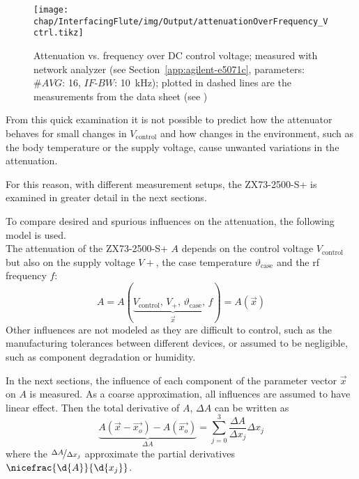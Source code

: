 \begin{figure}[tb]
	\centering
	\texttt{[image: chap/InterfacingFlute/img/Output/attenuationOverFrequency\_Vctrl.tikz]}
	\caption[Attenuation vs. frequency plot of the attenuator]{Attenuation vs. frequency over DC control voltage; measured with network analyzer (see Section~\ref{app:agilent-e5071c}, parameters: $\#AVG$: 16, $IF\text{-}BW$: \SI{10}{\kHz}); plotted in dashed lines are the measurements from the data sheet (see \cite[p.~2]{mini-circuitsZX732500VoltageVariable})}
	\label{fig:interfacingFlute_atteneval-overview-NA}
\end{figure}

From this quick examination it is not possible to predict how the attenuator behaves for small changes in $V_\text{control}$ and how changes in the environment, such as the body temperature or the supply voltage, cause unwanted variations in the attenuation. 

For this reason, with different measurement setups, the ZX73-2500-S+ is examined in greater detail in the next sections.

To compare desired and spurious influences on the attenuation, the following model is used.\\
The attenuation of the ZX73-2500-S+ $A$ depends on the control voltage $V_\text{control}$ but also on the supply voltage $V+$, the case temperature $\vartheta_\text{case}$ and the \gls{rf} frequency $f$:
\begin{equation}
A=A(\underbrace{V_\text{control},\,V_+,\,\vartheta_\text{case},\,f}_{\vec{x}}) = A\left(\vec{x}\right)
\end{equation}
Other influences are not modeled as they are difficult to control, such as the manufacturing tolerances between different devices, or assumed to be negligible, such as component degradation or humidity.

In the next sections, the influence of each component of the parameter vector $\vec{x}$ on $A$ is measured. As a coarse approximation, all influences are assumed to have linear effect. Then the total derivative of $A$, $\Delta A$ can be written as
\begin{equation}\label{eq:interfacingFlute_linearApprox}
\underbrace{A(\vec{x}-\vec{x_o})-A(\vec{x_o})}_{\Delta A} = \sum_{j=0}^{3} \frac{\Delta A}{\Delta x_j} \Delta x_j
\end{equation}
where the $\nicefrac{\Delta A}{\Delta x_j}$ approximate the partial derivatives $\nicefrac{\d{A}}{\d{x_j}}$.

